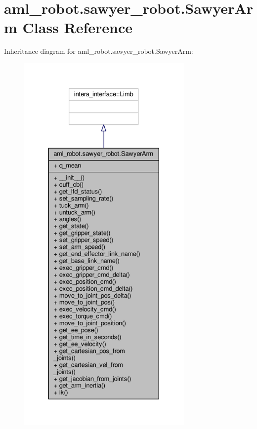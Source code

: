 \hypertarget{classaml__robot_1_1sawyer__robot_1_1_sawyer_arm}{\section{aml\-\_\-robot.\-sawyer\-\_\-robot.\-Sawyer\-Arm Class Reference}
\label{classaml__robot_1_1sawyer__robot_1_1_sawyer_arm}
}


Inheritance diagram for aml\-\_\-robot.\-sawyer\-\_\-robot.\-Sawyer\-Arm\-:
\nopagebreak
\begin{figure}[H]
\begin{center}
\leavevmode
\includegraphics[height=550pt]{classaml__robot_1_1sawyer__robot_1_1_sawyer_arm__inherit__graph}
\end{center}
\end{figure}



